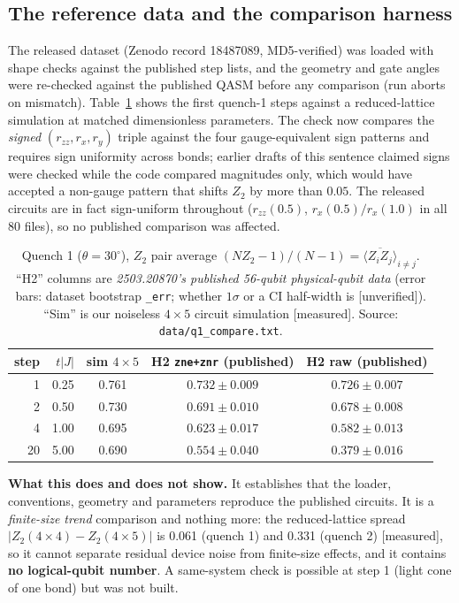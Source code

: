 \documentclass[11pt,a4paper]{article}
\newcommand{\tg}[1]{\textsf{\small[#1]}}
\newcommand{\mea}{\tg{measured}}
\newcommand{\unv}{\tg{unverified}}
\newcommand{\code}[1]{\nolinkurl{#1}}
\begin{document}
\subsection{The reference data and the comparison harness}
The released dataset (Zenodo record 18487089, MD5-verified) was loaded with shape checks against the published
step lists, and the geometry and gate angles were re-checked against the published QASM before any
comparison (run aborts on mismatch). Table~\ref{tab:q1} shows the first quench-1 steps against a reduced-lattice
simulation at matched dimensionless parameters. The check now compares the \emph{signed}
$(r_{zz}, r_x, r_y)$ triple against the four gauge-equivalent sign patterns and requires sign
uniformity across bonds; earlier drafts of this sentence claimed signs were checked while the code
compared magnitudes only, which would have accepted a non-gauge pattern that shifts $Z_2$ by more than
$0.05$. The released circuits are in fact sign-uniform throughout ($r_{zz}(0.5)$, $r_x(0.5)/r_x(1.0)$ in
all 80 files), so no published comparison was affected.

\begin{table}[h]\centering\small
\caption{Quench 1 ($\theta=30^\circ$), $Z_2$ pair average $(NZ_2-1)/(N-1)=\overline{\langle Z_iZ_j\rangle}_{i\neq j}$.
``H2'' columns are \emph{2503.20870's published 56-qubit physical-qubit data} (error bars: dataset bootstrap
\code{_err}; whether $1\sigma$ or a CI half-width is \unv). ``Sim'' is our noiseless $4\times5$ circuit
simulation \mea. Source: \code{data/q1_compare.txt}.}\label{tab:q1}
\begin{tabular}{rrccc}
\toprule
step & $t|J|$ & sim $4\times5$ & H2 \code{zne+znr} (published) & H2 raw (published) \\
\midrule
1 & 0.25 & 0.761 & $0.732\pm0.009$ & $0.726\pm0.007$ \\
2 & 0.50 & 0.730 & $0.691\pm0.010$ & $0.678\pm0.008$ \\
4 & 1.00 & 0.695 & $0.623\pm0.017$ & $0.582\pm0.013$ \\
20 & 5.00 & 0.690 & $0.554\pm0.040$ & $0.379\pm0.016$ \\
\bottomrule
\end{tabular}
\end{table}

\textbf{What this does and does not show.} It establishes that the loader, conventions, geometry and parameters
reproduce the published circuits. It is a \emph{finite-size trend} comparison and nothing more: the
reduced-lattice spread $|Z_2(4\times4)-Z_2(4\times5)|$ is 0.061 (quench 1) and 0.331 (quench 2) \mea, so it
cannot separate residual device noise from finite-size effects, and it contains \textbf{no logical-qubit
number}. A same-system check is possible at step 1 (light cone of one bond) but was not built.
\end{document}
